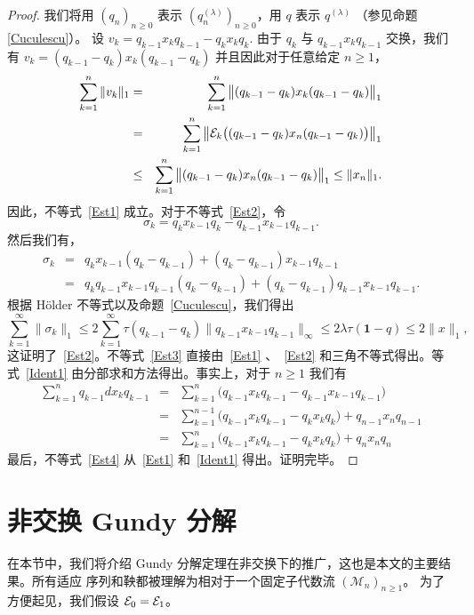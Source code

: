\begin{proof}
我们将用 $(q_n)_{n \ge 0}$ 表示 $(q_n^{(\lambda)})_{n \ge
0}$，用 $q$ 表示 $q^{(\lambda)}$ （参见命题 \ref{Cuculescu}）。
设 $v_k = q_{k-1} x_k q_{k-1} - q_k x_k q_k$. 由于 $q_k$
与 $q_{k-1} x_k q_{k-1}$ 交换，我们有 $v_k = (q_{k-1} -
q_k) x_k (q_{k-1} - q_k)$ 并且因此对于任意给定 $n \ge 1$，
\begin{eqnarray*}
\sum_{k=1}^n \|v_k\|_1 & = & \sum_{k=1}^n \big\| (q_{k-1} - q_k)
x_k (q_{k-1} - q_k) \big\|_1 \\ & = & \sum_{k=1}^n \big\|
\mathcal{E}_k \big( (q_{k-1} - q_k) x_n (q_{k-1} - q_k) \big)
\big\|_1
 \\ & \leq & \sum_{k=1}^n \big\| (q_{k-1} - q_k) x_n (q_{k-1}
- q_k) \big\|_1 \le \|x_n\|_1.
\end{eqnarray*}
因此，不等式~\eqref{Est1} 成立。对于不等式~\eqref{Est2}，令 $$\sigma_k = q_k x_{k-1} q_k - q_{k-1} x_{k-1}
q_{k-1}.$$ 然后我们有，
\begin{eqnarray*}
\sigma_k & = & q_k x_{k-1} (q_k - q_{k-1}) + (q_k -q_{k-1})
x_{k-1} q_{k-1} \\ & = & q_k q_{k-1} x_{k-1} q_{k-1} (q_k -
q_{k-1}) + (q_k - q_{k-1}) q_{k-1} x_{k-1} q_{k-1}.
\end{eqnarray*}
根据 H\"{o}lder 不等式以及命题~\ref{Cuculescu}，我们得出
\[\sum_{k=1}^\infty\|\sigma_k\|_1 \le 2 \sum_{k=1}^\infty
\tau(q_{k-1} - q_k) \big\| q_{k-1} x_{k-1} q_{k-1}\big\|_{\infty}
\le 2 \lambda \tau (\mathbf{1} - q)\leq 2\|x\|_1,
 \]
这证明了~\eqref{Est2}。不等式~\eqref{Est3}
直接由~\eqref{Est1} 、~\eqref{Est2} 和三角不等式得出。等式~\eqref{Ident1} 由分部求和方法得出。事实上，对于 $n\geq 1$ 我们有
\begin{eqnarray*}
\sum_{k=1}^n q_{k-1} dx_k q_{k-1} & = & \sum_{k=1}^n \big( q_{k-1}
x_k q_{k-1} - q_{k-1} x_{k-1} q_{k-1} \big) \\ & = &
\sum_{k=1}^{n-1} \big( q_{k-1} x_k q_{k-1} - q_k x_k q_k \big) +
q_{n-1} x_n q_{n-1} \\ & = & \sum_{k=1}^{n} \big( q_{k-1} x_k
q_{k-1} - q_k x_k q_k \big) + q_{n} x_n q_{n}
\end{eqnarray*}
最后，不等式~\eqref{Est4} 从~\eqref{Est1} 和~\eqref{Ident1} 得出。证明完毕。
\end{proof}

\section{非交换 Gundy 分解}
\label{Section2}

在本节中，我们将介绍 Gundy 分解定理在非交换下的推广，这也是本文的主要结果。所有适应
序列和鞅都被理解为相对于一个固定子代数流 $(\mathcal{M}_n)_{n \ge 1}$。
为了方便起见，我们假设 $\mathcal{E}_0=\mathcal{E}_1$。

